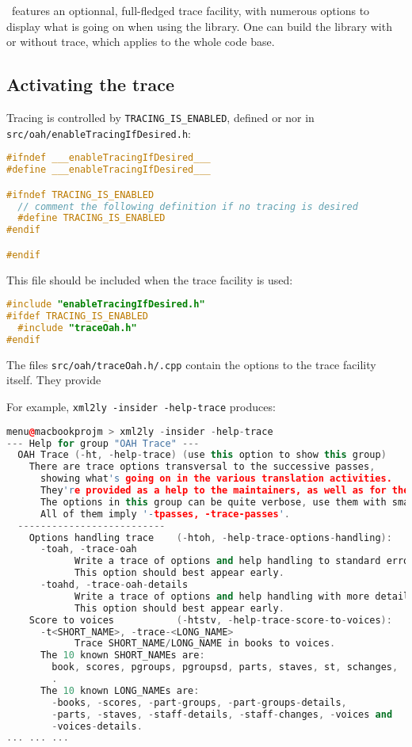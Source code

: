 \lib\ features an optionnal, full-fledged trace facility, with numerous options to display what is going on when using the library.
One can build the library with or without trace, which applies to the whole code base.

\subsection{Activating the trace}

Tracing is controlled by {\tt TRACING_IS_ENABLED}, defined or nor in {\tt src/oah/enableTracingIfDesired.h}:

\begin{lstlisting}[language=C++]
#ifndef ___enableTracingIfDesired___
#define ___enableTracingIfDesired___

#ifndef TRACING_IS_ENABLED
  // comment the following definition if no tracing is desired
  #define TRACING_IS_ENABLED
#endif

#endif
\end{lstlisting}

This file should be included when the trace facility is used:
\begin{lstlisting}[language=C++]
#include "enableTracingIfDesired.h"
#ifdef TRACING_IS_ENABLED
  #include "traceOah.h"
#endif
\end{lstlisting}

The files {\tt src/oah/traceOah.h/.cpp} contain the options to the trace facility itself.
They provide 

For example, {\tt xml2ly -insider -help-trace} produces:
\begin{lstlisting}[language=C++]
menu@macbookprojm > xml2ly -insider -help-trace
--- Help for group "OAH Trace" ---
  OAH Trace (-ht, -help-trace) (use this option to show this group)
    There are trace options transversal to the successive passes,
      showing what's going on in the various translation activities.
      They're provided as a help to the maintainers, as well as for the curious.
      The options in this group can be quite verbose, use them with small input data!
      All of them imply '-tpasses, -trace-passes'.
  --------------------------
    Options handling trace    (-htoh, -help-trace-options-handling):
      -toah, -trace-oah
            Write a trace of options and help handling to standard error.
            This option should best appear early.
      -toahd, -trace-oah-details
            Write a trace of options and help handling with more details to standard error.
            This option should best appear early.
    Score to voices           (-htstv, -help-trace-score-to-voices):
      -t<SHORT_NAME>, -trace-<LONG_NAME>
            Trace SHORT_NAME/LONG_NAME in books to voices.
      The 10 known SHORT_NAMEs are:
        book, scores, pgroups, pgroupsd, parts, staves, st, schanges,
        .
      The 10 known LONG_NAMEs are:
        -books, -scores, -part-groups, -part-groups-details,
        -parts, -staves, -staff-details, -staff-changes, -voices and
        -voices-details.
... ... ...
\end{lstlisting}



